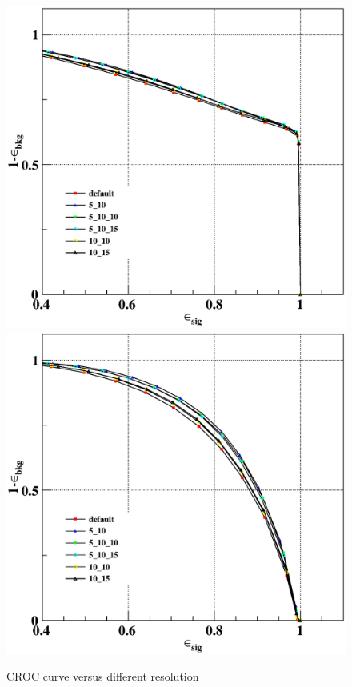 \documentclass[usetikz]{style/cepcnote}
\begin{document}
\begin{figure}[!ht]
	\centering
	\includegraphics[scale=0.35]{figures/resolution/plot6ROC-bbkg-cjet.eps}
	\includegraphics[scale=0.35]{figures/resolution/plot6ROC-obkg-cjet.eps}
	\caption{CROC curve versus different resolution}
	\label{fig:CROC_res}
\end{figure}
\end{document}
